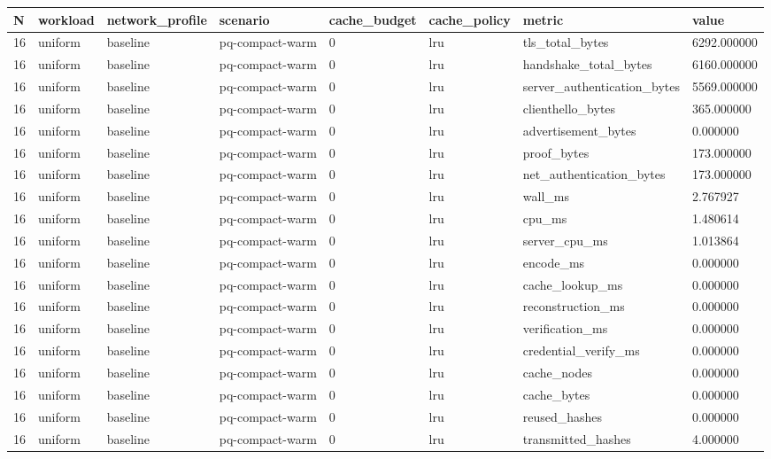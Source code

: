 \begin{tabular}{llllllll}
N & workload & network\_profile & scenario & cache\_budget & cache\_policy & metric & value \\ \hline
16 & uniform & baseline & pq-compact-warm & 0 & lru & tls\_total\_bytes & 6292.000000 \\
16 & uniform & baseline & pq-compact-warm & 0 & lru & handshake\_total\_bytes & 6160.000000 \\
16 & uniform & baseline & pq-compact-warm & 0 & lru & server\_authentication\_bytes & 5569.000000 \\
16 & uniform & baseline & pq-compact-warm & 0 & lru & clienthello\_bytes & 365.000000 \\
16 & uniform & baseline & pq-compact-warm & 0 & lru & advertisement\_bytes & 0.000000 \\
16 & uniform & baseline & pq-compact-warm & 0 & lru & proof\_bytes & 173.000000 \\
16 & uniform & baseline & pq-compact-warm & 0 & lru & net\_authentication\_bytes & 173.000000 \\
16 & uniform & baseline & pq-compact-warm & 0 & lru & wall\_ms & 2.767927 \\
16 & uniform & baseline & pq-compact-warm & 0 & lru & cpu\_ms & 1.480614 \\
16 & uniform & baseline & pq-compact-warm & 0 & lru & server\_cpu\_ms & 1.013864 \\
16 & uniform & baseline & pq-compact-warm & 0 & lru & encode\_ms & 0.000000 \\
16 & uniform & baseline & pq-compact-warm & 0 & lru & cache\_lookup\_ms & 0.000000 \\
16 & uniform & baseline & pq-compact-warm & 0 & lru & reconstruction\_ms & 0.000000 \\
16 & uniform & baseline & pq-compact-warm & 0 & lru & verification\_ms & 0.000000 \\
16 & uniform & baseline & pq-compact-warm & 0 & lru & credential\_verify\_ms & 0.000000 \\
16 & uniform & baseline & pq-compact-warm & 0 & lru & cache\_nodes & 0.000000 \\
16 & uniform & baseline & pq-compact-warm & 0 & lru & cache\_bytes & 0.000000 \\
16 & uniform & baseline & pq-compact-warm & 0 & lru & reused\_hashes & 0.000000 \\
16 & uniform & baseline & pq-compact-warm & 0 & lru & transmitted\_hashes & 4.000000 \\

\end{tabular}
